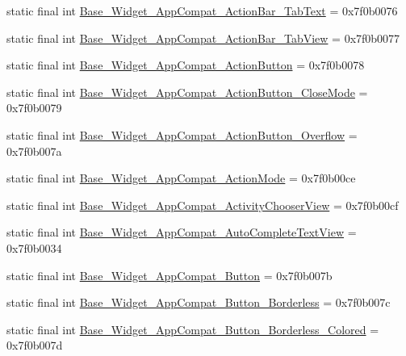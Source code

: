 \begin{CompactItemize}
\item 
static final int \hyperlink{classandroid_1_1support_1_1graphics_1_1drawable_1_1animated_1_1_r_1_1style_05e90fb99081f326f53f660ded41942c}{Base\_\-Widget\_\-AppCompat\_\-ActionBar\_\-TabText} = 0x7f0b0076
\item 
static final int \hyperlink{classandroid_1_1support_1_1graphics_1_1drawable_1_1animated_1_1_r_1_1style_295168f28a175d1e6bef68a2e8b9e956}{Base\_\-Widget\_\-AppCompat\_\-ActionBar\_\-TabView} = 0x7f0b0077
\item 
static final int \hyperlink{classandroid_1_1support_1_1graphics_1_1drawable_1_1animated_1_1_r_1_1style_52506fd2d40718f0c8a44bfb6a8d28fc}{Base\_\-Widget\_\-AppCompat\_\-ActionButton} = 0x7f0b0078
\item 
static final int \hyperlink{classandroid_1_1support_1_1graphics_1_1drawable_1_1animated_1_1_r_1_1style_86f26a8f1bc4fe64389554456fe5f0d1}{Base\_\-Widget\_\-AppCompat\_\-ActionButton\_\-CloseMode} = 0x7f0b0079
\item 
static final int \hyperlink{classandroid_1_1support_1_1graphics_1_1drawable_1_1animated_1_1_r_1_1style_9fd30d720d7abeda492135426e468226}{Base\_\-Widget\_\-AppCompat\_\-ActionButton\_\-Overflow} = 0x7f0b007a
\item 
static final int \hyperlink{classandroid_1_1support_1_1graphics_1_1drawable_1_1animated_1_1_r_1_1style_c0569380bf3f8d7658665a4578dcd05e}{Base\_\-Widget\_\-AppCompat\_\-ActionMode} = 0x7f0b00ce
\item 
static final int \hyperlink{classandroid_1_1support_1_1graphics_1_1drawable_1_1animated_1_1_r_1_1style_219bcae7b89f2eb25f015222ad15a1fe}{Base\_\-Widget\_\-AppCompat\_\-ActivityChooserView} = 0x7f0b00cf
\item 
static final int \hyperlink{classandroid_1_1support_1_1graphics_1_1drawable_1_1animated_1_1_r_1_1style_d99014f8ff8c2b51a92eecb5b6dd964e}{Base\_\-Widget\_\-AppCompat\_\-AutoCompleteTextView} = 0x7f0b0034
\item 
static final int \hyperlink{classandroid_1_1support_1_1graphics_1_1drawable_1_1animated_1_1_r_1_1style_80775092a11e452d9ba0a40b1a8c1986}{Base\_\-Widget\_\-AppCompat\_\-Button} = 0x7f0b007b
\item 
static final int \hyperlink{classandroid_1_1support_1_1graphics_1_1drawable_1_1animated_1_1_r_1_1style_5c0ecf07d54ada94588dd7a09c6e6733}{Base\_\-Widget\_\-AppCompat\_\-Button\_\-Borderless} = 0x7f0b007c
\item 
static final int \hyperlink{classandroid_1_1support_1_1graphics_1_1drawable_1_1animated_1_1_r_1_1style_8ed9f8b3bc5cc1f26402be666b77e163}{Base\_\-Widget\_\-AppCompat\_\-Button\_\-Borderless\_\-Colored} = 0x7f0b007d

\end{CompactItemize}
